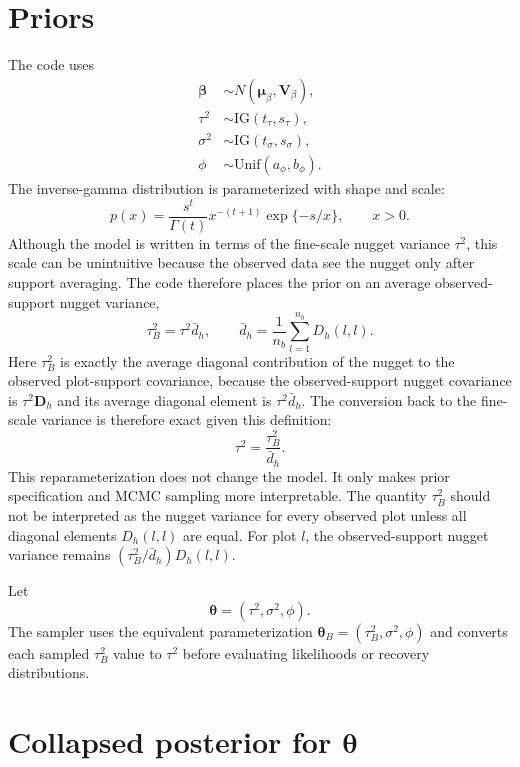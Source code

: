 \documentclass[11pt]{article}
\newcommand{\bsb}{\bm{\beta}}
\newcommand{\bstheta}{\bm{\theta}}
\begin{document}
\section{Priors}

The code uses
\begin{align}
\bsb &\sim N(\bm{\mu}_{\beta},\bm{V}_{\beta}), \label{eq:beta_prior}\\
\tau^2 &\sim \mathrm{IG}(t_{\tau},s_{\tau}), \label{eq:tau_prior}\\
\sigma^2 &\sim \mathrm{IG}(t_{\sigma},s_{\sigma}), \label{eq:sigma_prior}\\
\phi &\sim \mathrm{Unif}(a_{\phi},b_{\phi}). \label{eq:phi_prior}
\end{align}
The inverse-gamma distribution is parameterized with shape and scale:
\begin{equation}
p(x)
=
\frac{s^t}{\Gamma(t)}
x^{-(t+1)}
\exp\{-s/x\},
\qquad x>0.
\label{eq:ig_density}
\end{equation}
Although the model is written in terms of the fine-scale nugget variance $\tau^2$, this scale can be unintuitive because the observed data see the nugget only after support averaging. The code therefore places the prior on an average observed-support nugget variance,
$$
\tau_B^2 = \tau^2 \bar{d}_h,
\qquad
\bar{d}_h =
\frac{1}{n_b}\sum_{l=1}^{n_b} D_h(l,l).
$$
Here $\tau_B^2$ is exactly the average diagonal contribution of the nugget to the observed plot-support covariance, because the observed-support nugget covariance is $\tau^2\bm{D}_h$ and its average diagonal element is $\tau^2\bar{d}_h$. The conversion back to the fine-scale variance is therefore exact given this definition:
$$
\tau^2 = \frac{\tau_B^2}{\bar{d}_h}.
$$
This reparameterization does not change the model. It only makes prior specification and MCMC sampling more interpretable. The quantity $\tau_B^2$ should not be interpreted as the nugget variance for every observed plot unless all diagonal elements $D_h(l,l)$ are equal. For plot $l$, the observed-support nugget variance remains $(\tau_B^2/\bar{d}_h)D_h(l,l)$.

Let
\begin{equation}
\bstheta = (\tau^2,\sigma^2,\phi).
\label{eq:theta_def}
\end{equation}
The sampler uses the equivalent parameterization $\bstheta_B=(\tau_B^2,\sigma^2,\phi)$ and converts each sampled $\tau_B^2$ value to $\tau^2$ before evaluating likelihoods or recovery distributions.

\section{Collapsed posterior for $\bstheta$}
\end{document}
